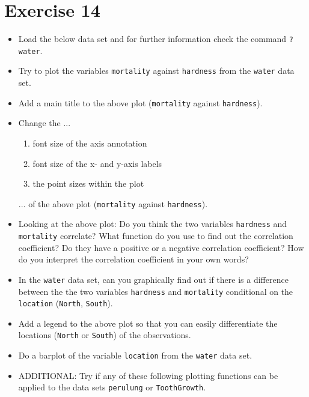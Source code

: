 \documentclass[11pt]{article}\usepackage[]{graphicx}\usepackage[]{color}
\begin{document}
\section*{Exercise 14}
\begin{itemize}
\item Load the below data set and for further information check the command
\texttt{?water}.

\item Try to plot the variables \texttt{mortality} against \texttt{hardness} from
the \texttt{water} data set.

\item Add a main title to the above plot (\texttt{mortality} against
\texttt{hardness}).

\item Change the ...
\begin{enumerate}
\item font size of the axis annotation
\item font size of the x- and y-axis labels
\item the point sizes within the plot
\end{enumerate}
... of the above plot (\texttt{mortality} against \texttt{hardness}).

\item Looking at the above plot: Do you think the two variables \texttt{hardness}
and \texttt{mortality} correlate? What function do you use to find out the correlation
coefficient? Do they have a positive or a negative correlation coefficient? How
do you interpret the correlation coefficient in your own words?

\item In the \texttt{water} data set, can you graphically find out if there is a
difference between the the two variables \texttt{hardness} and \texttt{mortality}
conditional on the \texttt{location} (\texttt{North}, \texttt{South}).

\item Add a legend to the above plot so that you can easily differentiate the
locations (\texttt{North} or \texttt{South}) of the observations.

\item Do a barplot of the variable \texttt{location} from the \texttt{water} data
set.

\item ADDITIONAL: Try if any of these following plotting functions can be
applied to the data sets \texttt{perulung} or \texttt{ToothGrowth}.


\end{itemize}
\end{document}
